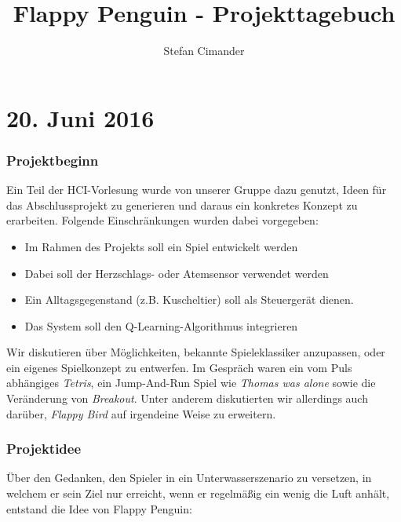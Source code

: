 \documentclass{report}
\begin{document}
\title{Flappy Penguin - Projekttagebuch}
\author{Stefan Cimander}
\date{}

\maketitle


\section*{20. Juni 2016}

\subsubsection*{Projektbeginn}

Ein Teil der HCI-Vorlesung wurde von unserer Gruppe dazu genutzt, Ideen für das Abschlussprojekt zu generieren und daraus ein konkretes Konzept zu erarbeiten. Folgende Einschränkungen wurden dabei vorgegeben:

\begin{itemize}
	\item Im Rahmen des Projekts soll ein Spiel entwickelt werden
  	\item Dabei soll der Herzschlags- oder Atemsensor verwendet werden
  	\item Ein Alltagsgegenstand (z.B. Kuscheltier) soll als Steuergerät dienen.
  	\item Das System soll den Q-Learning-Algorithmus integrieren
\end{itemize}

\noindent Wir diskutieren über Möglichkeiten, bekannte Spieleklassiker anzupassen, oder ein eigenes Spielkonzept zu entwerfen. Im Gespräch waren ein vom Puls abhängiges \textit{Tetris}, ein Jump-And-Run Spiel wie \textit{Thomas was alone} sowie die Veränderung von \textit{Breakout}. Unter anderem diskutierten wir allerdings auch darüber, \textit{Flappy Bird} auf irgendeine Weise zu erweitern.


\subsubsection*{Projektidee}

Über den Gedanken, den Spieler in ein Unterwasserszenario zu versetzen, in welchem er sein Ziel nur erreicht, wenn er regelmäßig ein wenig die Luft anhält, entstand die Idee von Flappy Penguin:
\end{document}
